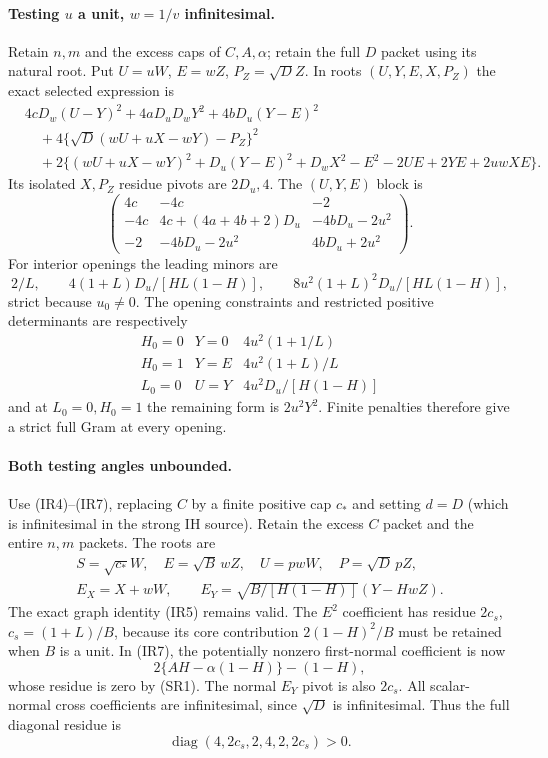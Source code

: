 \paragraph{Testing $u$ a unit, $w=1/v$ infinitesimal.}
Retain $n,m$ and the excess caps of $C,A,\alpha$; retain the full
$D$ packet using its natural root. Put
$U=uW$, $E=wZ$, $P_Z=\sqrt D Z$. In roots $(U,Y,E,X,P_Z)$ the exact
selected expression is
\begin{align*}
 &4cD_w(U-Y)^2+4aD_uD_wY^2+4bD_u(Y-E)^2\\
 &\quad+4\{\sqrt D(wU+uX-wY)-P_Z\}^2\\
 &\quad+2\{(wU+uX-wY)^2+D_u(Y-E)^2+D_wX^2-E^2
                   -2UE+2YE+2uwXE\}.
\tag{SR4}
\end{align*}
Its isolated $X,P_Z$ residue pivots are $2D_u,4$. The $(U,Y,E)$ block is
\[
 \begin{pmatrix}
 4c&-4c&-2\\
 -4c&4c+(4a+4b+2)D_u&-4bD_u-2u^2\\
 -2&-4bD_u-2u^2&4bD_u+2u^2
 \end{pmatrix}.
\tag{SR5}
\]
For interior openings the leading minors are
\[
 2/L,\qquad4(1+L)D_u/[HL(1-H)],\qquad
 8u^2(1+L)^2D_u/[HL(1-H)],
\tag{SR6}
\]
strict because $u_0\ne0$. The opening constraints and restricted
positive determinants are respectively
\[
 \begin{array}{c|c|c}
 H_0=0&Y=0&4u^2(1+1/L)\\
 H_0=1&Y=E&4u^2(1+L)/L\\
 L_0=0&U=Y&4u^2D_u/[H(1-H)]
 \end{array}
\]
and at $L_0=0,H_0=1$ the remaining form is $2u^2Y^2$.
Finite penalties therefore give a strict full Gram at every opening.

\paragraph{Both testing angles unbounded.}
Use (IR4)--(IR7), replacing $C$ by a finite positive cap $c_*$ and
setting $d=D$ (which is infinitesimal in the strong IH source).
Retain the excess $C$ packet and the entire $n,m$ packets.
The roots are
\[
 \begin{gathered}
 S=\sqrt{c_*}W,\quad E=\sqrt B\,wZ,\quad U=pwW,\quad P=\sqrt D\,pZ,\\
 E_X=X+wW,\qquad E_Y=\sqrt{B/[H(1-H)]}(Y-HwZ).
 \end{gathered}
\]
The exact graph identity (IR5) remains valid. The $E^2$ coefficient
has residue $2c_s$, $c_s=(1+L)/B$, because its core contribution
$2(1-H)^2/B$ must be retained when $B$ is a unit.
In (IR7), the potentially nonzero first-normal coefficient is now
\[
 2\{AH-\alpha(1-H)\}-(1-H),
\]
whose residue is zero by (SR1). The normal $E_Y$ pivot is also $2c_s$.
All scalar-normal cross coefficients are infinitesimal, since
$\sqrt D$ is infinitesimal. Thus the full diagonal residue is
\[
 \operatorname{diag}(4,2c_s,2,4,2,2c_s)>0.
\tag{SR7}
\]

